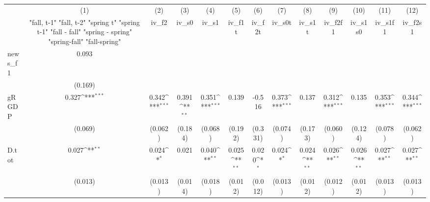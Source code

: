 {
\def\sym#1{\ifmmode^{#1}\else\(^{#1}\)\fi}
\begin{tabular}{l*{12}{c}}
\toprule
            &\multicolumn{1}{c}{(1)}&\multicolumn{1}{c}{(2)}&\multicolumn{1}{c}{(3)}&\multicolumn{1}{c}{(4)}&\multicolumn{1}{c}{(5)}&\multicolumn{1}{c}{(6)}&\multicolumn{1}{c}{(7)}&\multicolumn{1}{c}{(8)}&\multicolumn{1}{c}{(9)}&\multicolumn{1}{c}{(10)}&\multicolumn{1}{c}{(11)}&\multicolumn{1}{c}{(12)}\\
            &\multicolumn{1}{c}{  "fall, t-1" "fall, t-2" "spring t" "spring t-1"  "fall - fall" "spring - spring" "spring-fall" "fall-spring" }&\multicolumn{1}{c}{iv\_f2}&\multicolumn{1}{c}{iv\_s0}&\multicolumn{1}{c}{iv\_s1}&\multicolumn{1}{c}{iv\_f1t}&\multicolumn{1}{c}{iv\_f2t}&\multicolumn{1}{c}{iv\_s0t}&\multicolumn{1}{c}{iv\_s1t}&\multicolumn{1}{c}{iv\_f2f1}&\multicolumn{1}{c}{iv\_s1s0}&\multicolumn{1}{c}{iv\_s1f1}&\multicolumn{1}{c}{iv\_f2s1}\\
\midrule
news\_f1     &       0.093         &                     &                     &                     &                     &                     &                     &                     &                     &                     &                     &                     \\
            &     (0.169)         &                     &                     &                     &                     &                     &                     &                     &                     &                     &                     &                     \\
\addlinespace
gRGDP       &       0.327\sym{***}&       0.342\sym{***}&       0.391\sym{**} &       0.351\sym{***}&       0.139         &      -0.516         &       0.373\sym{***}&       0.137         &       0.312\sym{***}&       0.135         &       0.353\sym{***}&       0.344\sym{***}\\
            &     (0.069)         &     (0.062)         &     (0.184)         &     (0.068)         &     (0.192)         &     (0.331)         &     (0.074)         &     (0.173)         &     (0.060)         &     (0.124)         &     (0.078)         &     (0.062)         \\
\addlinespace
D.tot       &       0.027\sym{**} &       0.024\sym{*}  &       0.021         &       0.040\sym{**} &       0.025\sym{**} &       0.020\sym{*}  &       0.024\sym{*}  &       0.024\sym{**} &       0.026\sym{**} &       0.026\sym{**} &       0.027\sym{**} &       0.027\sym{**} \\
            &     (0.013)         &     (0.013)         &     (0.014)         &     (0.018)         &     (0.012)         &     (0.012)         &     (0.013)         &     (0.012)         &     (0.012)         &     (0.012)         &     (0.013)         &     (0.013)         \\

\end{tabular}}
